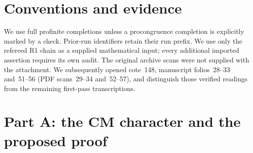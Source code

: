 \documentclass[11pt,a4paper]{article}
\begin{document}
\section*{Conventions and evidence}
We use full profinite completions unless a procongruence completion is explicitly marked by a check. Prior-run identifiers retain their run prefix. We use only the refereed R1 chain as a supplied mathematical input; every additional imported assertion requires its own audit. The original archive scans were not supplied with the attachment. We subsequently opened cote~148, manuscript folios~28--33 and~51--56 (PDF scans~29--34 and~52--57), and distinguish those verified readings from the remaining first-pass transcriptions.

\section{Part A: the CM character and the proposed proof}



























































\end{document}
